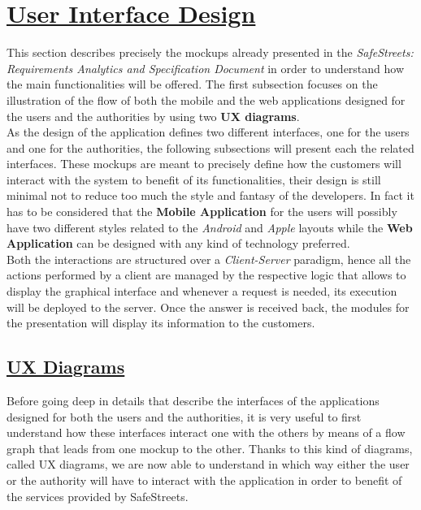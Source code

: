 \section[User Interface Design]{\hyperlink{toc}{User Interface Design}}
	\label{sec:userInterfaceDesign}
	
	This section describes precisely the mockups already presented in the \emph{SafeStreets: Requirements Analytics and Specification Document} \cite{RASD} in order to understand how the main functionalities will be offered. The first subsection focuses on the illustration of the flow of both the mobile and the web applications designed for the users and the authorities by using two \textbf{UX diagrams}.\\
	
	As the design of the application defines two different interfaces, one for the users and one for the authorities, the following subsections will present each the related interfaces. These mockups are meant to precisely define how the customers will interact with the system to benefit of its functionalities, their design is still minimal not to reduce too much the style and fantasy of the developers. In fact it has to be considered that the \textbf{Mobile Application} for the users will possibly have two different styles related to the \emph{Android} and \emph{Apple} layouts while the \textbf{Web Application} can be designed with any kind of technology preferred.\\
	
	Both the interactions are structured over a \emph{Client-Server} paradigm, hence all the actions performed by a client are managed by the respective logic that allows to display the graphical interface and whenever a request is needed, its execution will be deployed to the server. Once the answer is received back, the modules for the presentation will display its information to the customers.
	
	\subsection[UX Diagrams]{\hyperlink{toc}{UX Diagrams}}
		\label{sec:uxDiagrams}
		
		Before going deep in details that describe the interfaces of the applications designed for both the users and the authorities, it is very useful to first understand how these interfaces interact one with the others by means of a flow graph that leads from one mockup to the other. Thanks to this kind of diagrams, called UX diagrams, we are now able to understand in which way either the user or the authority will have to interact with the application in order to benefit of the services provided by SafeStreets.
		
